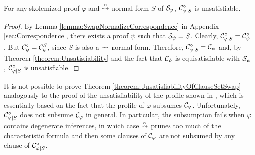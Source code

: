 \begin{theorem}\\
\label{theorem:UnsatisfiabilityOfClauseSetSwap}
For any skolemized proof $\varphi$ and $\stackrel{\circ}{\leadsto}$-normal-form $S$ of $\mathcal{S}_{\varphi}$, $\mathcal{C}^{\circ}_{\varphi|S}$ is unsatisfiable.
\end{theorem}
\begin{proof}
By Lemma \ref{lemma:SwapNormalizeCorrespondence} in Appendix \ref{sec:Correspondence},
there exists a proof $\psi$ such that $\mathcal{S}_{\psi} = S$. Clearly, 
$\mathcal{C}^{\circ}_{\varphi|S} = \mathcal{C}^{\circ}_{\psi}$. 
But $\mathcal{C}^{\circ}_{\psi} = \mathcal{C}^S_{\psi}$, 
since $S$ is also a $\leadsto$-normal-form. 
Therefore, $\mathcal{C}^{\circ}_{\varphi|S} = \mathcal{C}_{\psi}$ and, 
by Theorem \ref{theorem:Unsatisfiability} and the fact that 
$\mathcal{C}_{\psi}$ is equisatisfiable with $\mathcal{S}_{\psi}$, 
$\mathcal{C}^{\circ}_{\varphi|S}$ is unsatisfiable.
\end{proof}


\begin{remark}
It is not possible to prove Theorem \ref{theorem:UnsatisfiabilityOfClauseSetSwap} analogously to the proof of the unsatisfiability of the profile shown in \cite{Hetzl2007CharacteristicClauseSetsandProofTransformations,Hetzl2008ProofProfiles.CharacteristicClauseSetsandProofTransformations}, which is essentially based on the fact that the profile of $\varphi$ subsumes $\mathcal{C}_{\varphi}$. Unfortunately, $\mathcal{C}^{\circ}_{\varphi|S}$ does not subsume $\mathcal{C}_{\varphi}$ in general. In particular, the subsumption fails when $\varphi$ contains degenerate inferences, in which case $\stackrel{\circ}{\leadsto}$ prunes too much of the characteristic formula and then some clauses of $\mathcal{C}_{\varphi}$ are not subsumed by any clause of $\mathcal{C}^{\circ}_{\varphi|S}$.
\end{remark}
